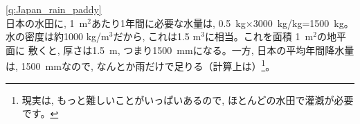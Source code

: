 

\ref{q:Japan_rain_paddy}\\
日本の水田に, 1~m$^2$あたり1年間に必要な水量は, 0.5~kg$\times$3000~kg/kg=1500~kg。
水の密度は約1000 kg/m$^3$だから, これは1.5 m$^3$に相当。これを面積 1~m$^2$の地平面に
敷くと, 厚さは1.5~m, つまり1500~mmになる。一方, 日本の平均年間降水量は, 1500~mmなので, 
なんとか雨だけで足りる（計算上は）\footnote{現実は, もっと難しいことがいっぱいあるので, 
ほとんどの水田で灌漑が必要です。}。
\vspace{0.2cm}


